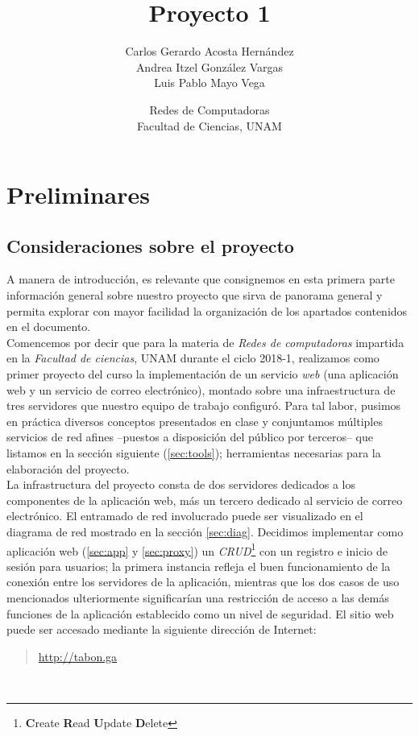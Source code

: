 \documentclass[12pt]{article}
\title{Proyecto 1}
\author{Carlos Gerardo Acosta Hernández \\ Andrea Itzel González Vargas \\ Luis Pablo Mayo Vega}
\date{Redes de Computadoras\\Facultad de Ciencias, UNAM}
\begin{document}
\maketitle
\tableofcontents

\newpage
\section{Preliminares}
\subsection{Consideraciones sobre el proyecto}
A manera de introducción, es relevante que consignemos en esta primera parte información general
sobre nuestro proyecto que sirva de panorama general y permita explorar con mayor facilidad la organización de los apartados contenidos en el documento.\\

Comencemos por decir que para la materia de \textit{Redes de computadoras} impartida en la \textit{Facultad de ciencias}, UNAM durante el ciclo 2018-1, realizamos como primer proyecto del curso la implementación de un servicio \textit{web} (una aplicación web y un servicio de correo electrónico), montado sobre una infraestructura de tres servidores que nuestro equipo de trabajo configuró. Para tal labor, pusimos en práctica diversos conceptos presentados en clase y
conjuntamos múltiples servicios de red afines --puestos a disposición del público por terceros-- que listamos en la sección siguiente (\ref{sec:tools}); herramientas necesarias para la elaboración del proyecto.\\

La infrastructura del proyecto consta de dos servidores dedicados a los componentes de la aplicación web, más un tercero dedicado al servicio de correo electrónico. El entramado de red involucrado puede ser visualizado en el diagrama de red mostrado en la sección \ref{sec:diag}. Decidimos implementar como aplicación web (\ref{sec:app} y \ref{sec:proxy}) un \textit{CRUD}\footnote{\textbf{C}reate \textbf{R}ead \textbf{U}pdate \textbf{D}elete} con un registro e inicio de sesión para usuarios; la primera instancia refleja el buen funcionamiento de la conexión entre los servidores de la aplicación, mientras que los dos casos de uso mencionados ulteriormente significarían una restricción de acceso a las demás funciones de la aplicación establecido como un nivel de seguridad. El sitio web puede ser accesado mediante la siguiente dirección de Internet:
\begin{quote}
  \href{http://tabon.ga}{http://tabon.ga}
\end{quote}
\\
\end{document}
